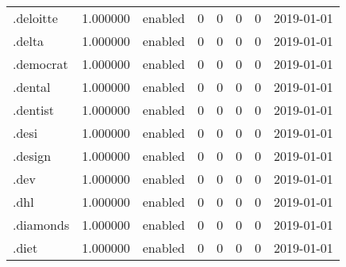 \begin{tabular}{lrlrrrrl}
.deloitte                 &          1.000000 &         enabled &                           0 &                           0 &                           0 &                   0 &           2019-01-01 \\
.delta                    &          1.000000 &         enabled &                           0 &                           0 &                           0 &                   0 &           2019-01-01 \\
.democrat                 &          1.000000 &         enabled &                           0 &                           0 &                           0 &                   0 &           2019-01-01 \\
.dental                   &          1.000000 &         enabled &                           0 &                           0 &                           0 &                   0 &           2019-01-01 \\
.dentist                  &          1.000000 &         enabled &                           0 &                           0 &                           0 &                   0 &           2019-01-01 \\
.desi                     &          1.000000 &         enabled &                           0 &                           0 &                           0 &                   0 &           2019-01-01 \\
.design                   &          1.000000 &         enabled &                           0 &                           0 &                           0 &                   0 &           2019-01-01 \\
.dev                      &          1.000000 &         enabled &                           0 &                           0 &                           0 &                   0 &           2019-01-01 \\
.dhl                      &          1.000000 &         enabled &                           0 &                           0 &                           0 &                   0 &           2019-01-01 \\
.diamonds                 &          1.000000 &         enabled &                           0 &                           0 &                           0 &                   0 &           2019-01-01 \\
.diet                     &          1.000000 &         enabled &                           0 &                           0 &                           0 &                   0 &           2019-01-01 \\

\end{tabular}
